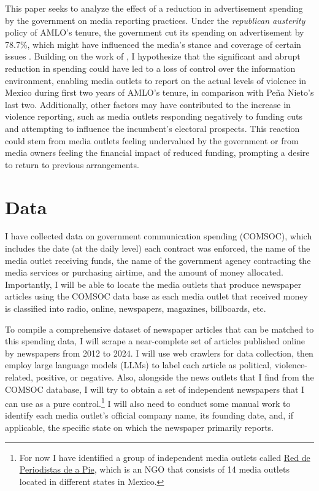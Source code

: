 \documentclass[14]{article}
\begin{document}
This paper seeks to analyze the effect of a reduction in advertisement spending by the government on media reporting practices. Under the \textit{republican austerity} policy of AMLO's tenure, the government cut its spending on advertisement by 78.7\%, which might have influenced the media’s stance and coverage of certain issues \citep{Article19}. Building on the work of \cite{Censor-Pratt-AER}, I hypothesize that the significant and abrupt reduction in spending could have led to a loss of control over the information environment, enabling media outlets to report on the actual levels of violence in Mexico during first two years of AMLO's tenure, in comparison with Peña Nieto's last two. Additionally, other factors may have contributed to the increase in violence reporting, such as media outlets responding negatively to funding cuts and attempting to influence the incumbent’s electoral prospects. This reaction could stem from media outlets feeling undervalued by the government or from media owners feeling the financial impact of reduced funding, prompting a desire to return to previous arrangements.

\section{Data}

I have collected data on government communication spending (COMSOC), which includes the date (at the daily level) each contract was enforced, the name of the media outlet receiving funds, the name of the government agency contracting the media services or purchasing airtime, and the amount of money allocated. Importantly, I will be able to locate the media outlets that produce newspaper articles using the COMSOC data base as each media outlet that received money is classified into radio, online, newspapers, magazines, billboards, etc.

To compile a comprehensive dataset of newspaper articles that can be matched to this spending data, I will scrape a near-complete set of articles published online by newspapers from 2012 to 2024. I will use web crawlers for data collection, then employ large language models (LLMs) to label each article as political, violence-related, positive, or negative. Also, alongside the news outlets that I find from the COMSOC database, I will try to obtain a set of independent newspapers that I can use as a pure control.\footnote{For now I have identified a group of independent media outlets called \href{https://periodistasdeapie.org.mx/quienes-somos/}{Red de Periodistas de a Pie}, which is an NGO that consists of 14 media outlets located in different states in Mexico.} I will also need to conduct some manual work to identify each media outlet’s official company name, its founding date, and, if applicable, the specific state on which the newspaper primarily reports.
\end{document}
